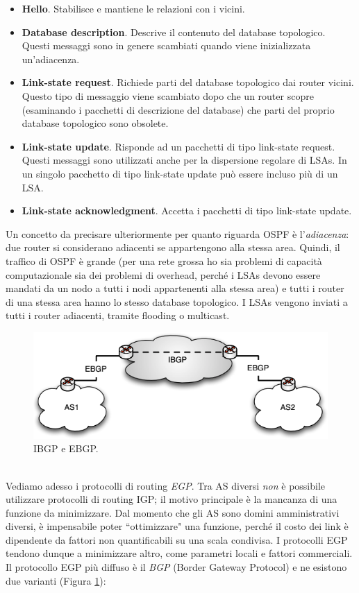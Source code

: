 \begin{itemize}
	\item \textbf{Hello}. Stabilisce e mantiene le relazioni con i vicini.
	\item \textbf{Database description}. Descrive il contenuto del database topologico. Questi messaggi sono in genere scambiati quando viene inizializzata un'adiacenza.
	\item \textbf{Link-state request}. Richiede parti del database topologico dai router vicini. Questo tipo di messaggio viene scambiato dopo che un router scopre (esaminando i pacchetti di descrizione del database) che parti del proprio database topologico sono obsolete.
	\item \textbf{Link-state update}. Risponde ad un pacchetti di tipo link-state request. Questi messaggi sono utilizzati anche per la dispersione regolare di LSAs. In un singolo pacchetto di tipo link-state update può essere incluso più di un LSA.
	\item \textbf{Link-state acknowledgment}. Accetta i pacchetti di tipo link-state update.
\end{itemize}
Un concetto da precisare ulteriormente per quanto riguarda OSPF è l'\textit{adiacenza}: due router si considerano adiacenti se appartengono alla stessa area. Quindi, il traffico di OSPF è grande (per una rete grossa ho sia problemi di capacità computazionale sia dei problemi di overhead, perché i LSAs devono essere mandati da un nodo a tutti i nodi appartenenti alla stessa area) e tutti i router di una stessa area hanno lo stesso database topologico. I LSAs vengono inviati a tutti i router adiacenti, tramite flooding o multicast.
\begin{figure}[htbp]
	\centering
	\includegraphics[scale = 0.5]{images/BGP}
	\caption{IBGP e EBGP.}
	\label{img:BGP}
\end{figure}\\
Vediamo adesso i protocolli di routing \textit{EGP}. Tra AS diversi \textit{non} è possibile utilizzare protocolli di routing IGP; il motivo principale è la mancanza di una funzione da minimizzare. Dal momento che gli AS sono domini amministrativi diversi, è impensabile poter \textquotedblleft ottimizzare" una funzione, perché il costo dei link è dipendente da fattori non quantificabili su una scala condivisa. I protocolli EGP tendono dunque a minimizzare altro, come parametri locali e fattori commerciali. Il protocollo EGP più diffuso è il \textit{BGP} (Border Gateway Protocol) e ne esistono due varianti (Figura \ref{img:BGP}):
